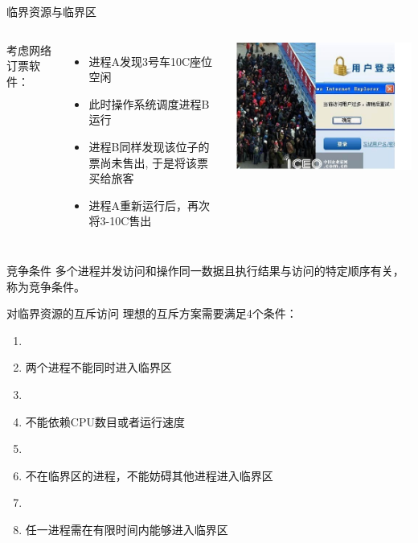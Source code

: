 \documentclass[xcolor=svgnames]{beamer}
\begin{document}
\begin{CJK*}{UTF8}{gbsn}
\begin{frame}{临界资源与临界区}
\begin{columns}%
考虑网络订票软件：
\begin{itemize}
\item 进程A发现3号车10C座位空闲
\item 此时操作系统调度进程B运行
\item 进程B同样发现该位子的票尚未售出, 于是将该票买给旅客
\item 进程A重新运行后，再次将3-10C售出
\end{itemize}
\includegraphics[width=1.0\textwidth]{booking.jpg}
\end{columns}%
\end{frame}

\begin{frame}{竞争条件}
多个进程并发访问和操作同一数据且执行结果与访问的特定顺序有关，称为竞争条件。
\end{frame}

\begin{frame}{对临界资源的互斥访问}
理想的互斥方案需要满足4个条件：
\begin{enumerate}
\item[]
\item 两个进程不能同时进入临界区
\item[]
\item 不能依赖CPU数目或者运行速度
\item[]
\item 不在临界区的进程，不能妨碍其他进程进入临界区
\item[]
\item 任一进程需在有限时间内能够进入临界区
\end{enumerate}
\end{frame}


\end{CJK*}
\end{document}
